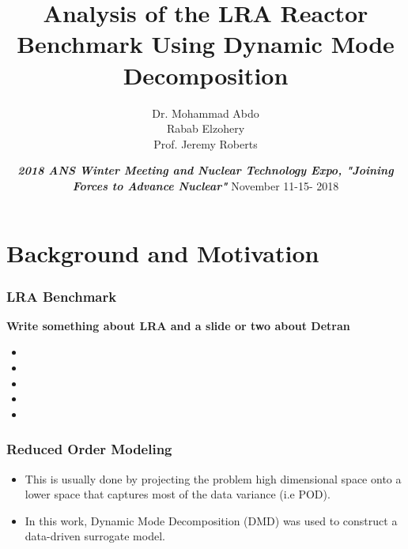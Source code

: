 \documentclass[fleqn]{beamer}
\title[]{
    Analysis of the LRA Reactor Benchmark Using Dynamic Mode Decomposition}
\author[]{
	Dr. Mohammad Abdo \\
    Rabab Elzohery \\
    Prof. Jeremy Roberts}
\institute[Kansas State University]{
    Mechanical and Nuclear Engineering \\
    Kansas State University}
\date[]{\emph{\textbf{2018 ANS Winter Meeting and Nuclear Technology Expo, "Joining Forces to Advance Nuclear"}}
    November 11-15- 2018}
\renewcommand{\vec}[1]{\bm{#1}} %
\begin{document}
    \newcommand{\beginbackup}{
        \newcounter{framenumbervorappendix}
        \setcounter{framenumbervorappendix}{\value{framenumber}}
    }
    \newcommand{\backupend}{
        \addtocounter{framenumbervorappendix}{-\value{framenumber}}
        \addtocounter{framenumber}{\value{framenumbervorappendix}} 
    }
    
    \begin{frame}
        \titlepage
    \end{frame}
    

    \section{Background and Motivation}
    
    \begin{frame}
        \frametitle{LRA Benchmark}
\textbf{Write something about LRA and a slide or two about Detran}       
\begin{itemize}
       \item 
       \item 
   
       \item  
%         
    \item 
    
    \item 
       
  
       \end{itemize}
    \end{frame}

    
    \begin{frame}
    \frametitle{Reduced Order Modeling}

    \begin{itemize}
   \begin{block}{ROM}
\centering
$\vec{f}(\vec{x})\approx \vec{g}(\mathcal{M}(\vec{x})); \ \ \vec{x} \subseteq \mathbb{R}^n, \mathcal{M}(\vec{x}) \in \mathbb{R}^{r_x}; r_x << n$
\end{block}

    \item This is usually done by projecting the problem high dimensional space onto a lower space that captures most of the data variance (i.e POD).
    
    \item In this work, Dynamic Mode Decomposition (DMD) was used to construct a data-driven surrogate model. 
    \end{itemize}
    \end{frame}
\end{document}
